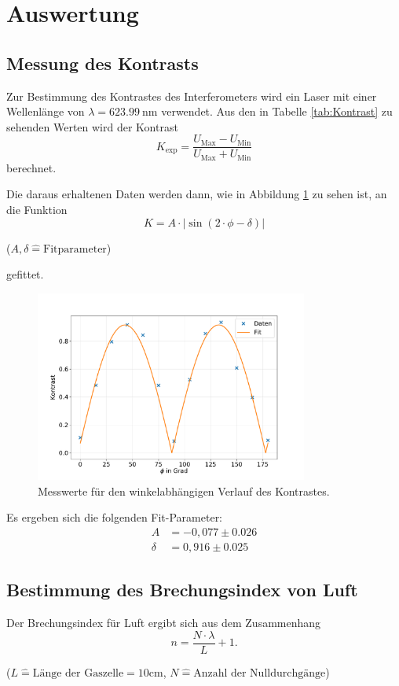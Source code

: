 \section{Auswertung}
\subsection{Messung des Kontrasts}
Zur Bestimmung des Kontrastes des Interferometers wird ein Laser mit einer Wellenlänge von $\lambda = \SI{623,99}{\nano \meter}$ verwendet. Aus den in Tabelle \ref{tab:Kontrast} zu sehenden Werten wird der Kontrast 
\begin{equation}
    K_\text{exp} = \frac{U_\text{Max}-U_\text{Min}}{U_\text{Max}+U_\text{Min}}
\end{equation} 
berechnet.

Die daraus erhaltenen Daten werden dann, wie in Abbildung \ref{fig:Kontrast} zu sehen ist, an die Funktion
\begin{equation}
    K = A \cdot | \sin{(2 \cdot \phi -\delta)} |
\end{equation}
\begin{center}
    \tiny{($A, \delta \hat{=} \text{Fitparameter} $)}
\end{center}
gefittet. 
\begin{figure}[H]
    \centering
    \includegraphics[width=0.8\textwidth]{data/kontrast.pdf}
    \caption{Messwerte für den winkelabhängigen Verlauf des Kontrastes.}
    \label{fig:Kontrast}
\end{figure}
Es ergeben sich die folgenden Fit-Parameter:
\begin{align}
       A &=  -0,077 \pm 0.026 \\
  \delta &=  0,916 \pm 0.025
\end{align}

\subsection{Bestimmung des Brechungsindex von Luft}
Der Brechungsindex für Luft ergibt sich aus dem Zusammenhang
\begin{equation}
    n = \frac{N \cdot \lambda}{L} + 1 .
\end{equation}
\begin{center}
    \tiny{($L \hat{=} \text{Länge der Gaszelle} = 10 \si{\centi \meter} $, $ N \hat{=} \text{Anzahl der Nulldurchgänge} $)} \label{eqn:n}
\end{center}

